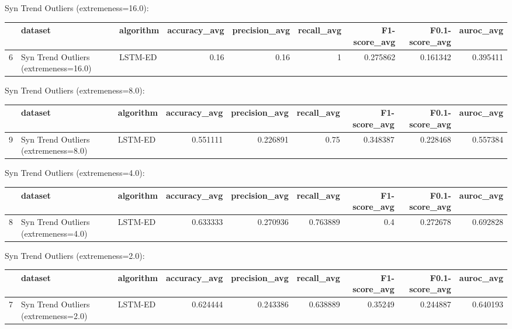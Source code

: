 Syn Trend Outliers (extremeness=16.0):

\begin{tabular}{rllrrrrrr}
\hline
    & dataset                               & algorithm   &   accuracy\_avg &   precision\_avg &   recall\_avg &   F1-score\_avg &   F0.1-score\_avg &   auroc\_avg \\
\hline
  6 & Syn Trend Outliers (extremeness=16.0) & LSTM-ED     &           0.16 &            0.16 &            1 &       0.275862 &         0.161342 &    0.395411 \\
\hline
\end{tabular}

Syn Trend Outliers (extremeness=8.0):

\begin{tabular}{rllrrrrrr}
\hline
    & dataset                              & algorithm   &   accuracy\_avg &   precision\_avg &   recall\_avg &   F1-score\_avg &   F0.1-score\_avg &   auroc\_avg \\
\hline
  9 & Syn Trend Outliers (extremeness=8.0) & LSTM-ED     &       0.551111 &        0.226891 &         0.75 &       0.348387 &         0.228468 &    0.557384 \\
\hline
\end{tabular}

Syn Trend Outliers (extremeness=4.0):

\begin{tabular}{rllrrrrrr}
\hline
    & dataset                              & algorithm   &   accuracy\_avg &   precision\_avg &   recall\_avg &   F1-score\_avg &   F0.1-score\_avg &   auroc\_avg \\
\hline
  8 & Syn Trend Outliers (extremeness=4.0) & LSTM-ED     &       0.633333 &        0.270936 &     0.763889 &            0.4 &         0.272678 &    0.692828 \\
\hline
\end{tabular}

Syn Trend Outliers (extremeness=2.0):

\begin{tabular}{rllrrrrrr}
\hline
    & dataset                              & algorithm   &   accuracy\_avg &   precision\_avg &   recall\_avg &   F1-score\_avg &   F0.1-score\_avg &   auroc\_avg \\
\hline
  7 & Syn Trend Outliers (extremeness=2.0) & LSTM-ED     &       0.624444 &        0.243386 &     0.638889 &        0.35249 &         0.244887 &    0.640193 \\
\hline
\end{tabular}

